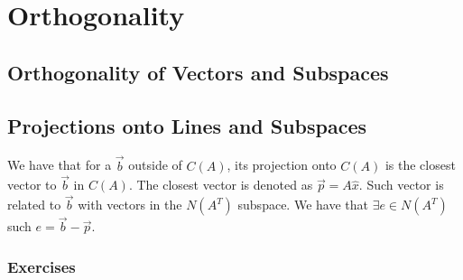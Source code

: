 \chapter{Orthogonality}

\section{Orthogonality of Vectors and Subspaces}

\section{Projections onto Lines and Subspaces}

We have that for a $\vec{b}$ outside of $C(A)$, its projection onto $C(A)$ is the closest vector to $\vec{b}$ in $C(A)$. The closest vector is denoted as $\vec{p} = A\hat{x}$. Such vector is related to $\vec{b}$ with vectors in the $N(A^T)$ subspace. We have that $\exists e \in N(A^T)$ such $e = \vec{b} - \vec{p}$.

\subsection{Exercises}

